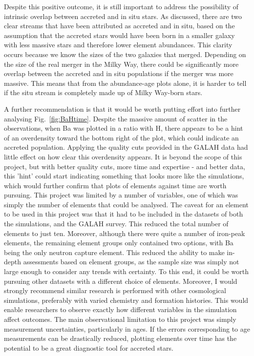 \documentclass[fleqn,usenatbib]{mnras}
\begin{document}
Despite this positive outcome, it is still important to address the possibility of intrinsic overlap between accreted and in situ stars. As discussed, there are two clear streams that have been attributed as accreted and in situ, based on the assumption that the accreted stars would have been born in a smaller galaxy with less massive stars and therefore lower element abundances. This clarity occurs because we know the sizes of the two galaxies that merged. Depending on the size of the real merger in the Milky Way, there could be significantly more overlap between the accreted and in situ populations if the merger was more massive. This means that from the abundance-age plots alone, it is harder to tell if the situ stream is completely made up of Milky Way-born stars. 

A further recommendation is that it would be worth putting effort into further analysing Fig.~\ref{fig:BaHtime}. Despite the massive amount of scatter in the observations, when Ba was plotted in a ratio with H, there appears to be a hint of an overdensity toward the bottom right of the plot, which could indicate an accreted population. Applying the quality cuts provided in the GALAH data had little effect on how clear this overdensity appears. It is beyond the scope of this project, but with better quality cuts, more time and expertise - and better data, this 'hint' could start indicating something that looks more like the simulations, which would further confirm that plots of elements against time are worth pursuing.  
This project was limited by a number of variables, one of which was simply the number of elements that could be analysed. The caveat for an element to be used in this project was that it had to be included in the datasets of both the simulations, and the GALAH survey. This reduced the total number of elements to just ten. Moreover, although there were quite a number of iron-peak elements, the remaining element groups only contained two options, with Ba being the only neutron capture element. This reduced the ability to make in-depth assessments based on element groups, as the sample size was simply not large enough to consider any trends with certainty. To this end, it could be worth pursuing other datasets with a different choice of elements.  
Moreover, I would strongly recommend similar research is performed with other cosmological simulations, preferably with varied chemistry and formation histories. This would enable researchers to observe exactly how different variables in the simulation affect outcomes. 
The main observational limitation to this project was simply measurement uncertainties, particularly in ages. If the errors corresponding to age measurements can be drastically reduced, plotting elements over time has the potential to be a great diagnostic tool for accreted stars. 
\end{document}

